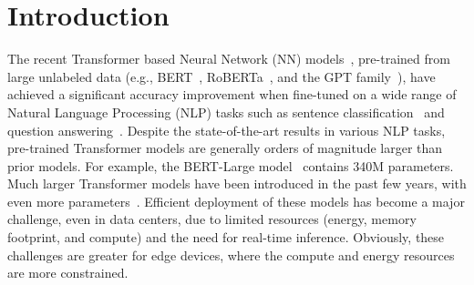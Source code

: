 \vspace{-4mm}
\section{\textbf{ Introduction}}
\label{sec:intro}

The recent Transformer based Neural Network (NN) models~\cite{vaswani2017attention}, pre-trained from large unlabeled data (e.g., BERT~\cite{devlin2018bert}, RoBERTa~\cite{liu2019roberta}, and the GPT family~\cite{radford2018improving,radford2019language,brown2020language}), have achieved a significant accuracy improvement
when fine-tuned on a wide range of Natural Language Processing (NLP) tasks 
such as sentence classification~\cite{wang2018glue} and question answering~\cite{rajpurkar2016squad}.   
Despite the state-of-the-art results in various NLP tasks, pre-trained Transformer models are 
generally orders of magnitude larger than prior models.
For example, the BERT-Large model~\cite{devlin2018bert} contains 340M parameters.
Much larger Transformer models have been introduced in the past few years, with even more parameters~\cite{radford2019language, brown2020language, shoeybi2019megatron, rosset2019turing, yang2019xlnet, lepikhin2020gshard, raffel2019exploring}.
Efficient deployment of these models has become a major challenge, even in data centers, due to limited resources (energy, memory footprint, and compute) and the need for real-time inference. 
Obviously, these challenges are greater for edge devices, where the compute and energy
resources are more constrained.


